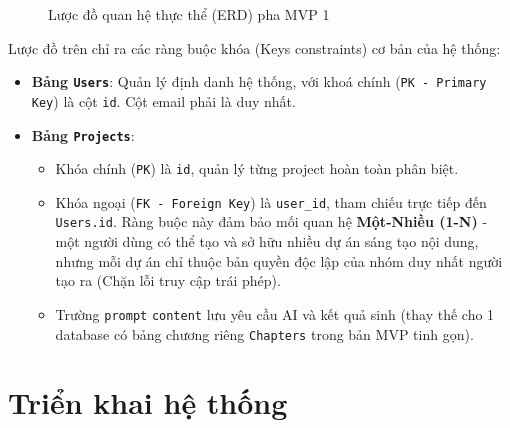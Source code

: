 \documentclass[final]{hcmuitthesis}
\begin{document}
\begin{figure}[H]
    \caption{Lược đồ quan hệ thực thể (ERD) pha MVP 1}
    \label{fig:erd_mvp}
\end{figure}

Lược đồ trên chỉ ra các ràng buộc khóa (Keys constraints) cơ bản của hệ thống:
\begin{itemize}
    \item \textbf{Bảng \texttt{Users}}: Quản lý định danh hệ thống, với khoá chính (\texttt{PK - Primary Key}) là cột \texttt{id}. Cột email phải là duy nhất.
    \item \textbf{Bảng \texttt{Projects}}: 
    \begin{itemize}
        \item Khóa chính (\texttt{PK}) là \texttt{id}, quản lý từng project hoàn toàn phân biệt.
        \item Khóa ngoại (\texttt{FK - Foreign Key}) là \texttt{user\_id}, tham chiếu trực tiếp đến \texttt{Users.id}. Ràng buộc này đảm bảo mối quan hệ \textbf{Một-Nhiều (1-N)} - một người dùng có thể tạo và sở hữu nhiều dự án sáng tạo nội dung, nhưng mỗi dự án chỉ thuộc bản quyền độc lập của nhóm duy nhất người tạo ra (Chặn lỗi truy cập trái phép).
        \item Trường \texttt{prompt} \texttt{content} lưu yêu cầu AI và kết quả sinh (thay thế cho 1 database có bảng chương riêng \texttt{Chapters} trong bản MVP tinh gọn).
    \end{itemize}
\end{itemize}

\chapter{Triển khai hệ thống}
\end{document}
